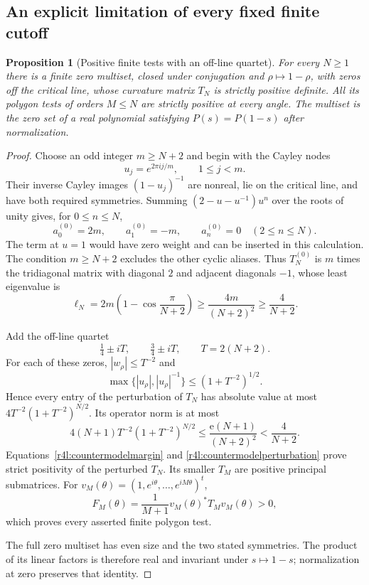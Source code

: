 \documentclass[11pt,a4paper]{article}
\newtheorem{proposition}[theorem]{Proposition}
\theoremstyle{definition}\newtheorem{definition}[theorem]{Definition}
\theoremstyle{remark}\newtheorem{remark}[theorem]{Remark}
\numberwithin{equation}{section}
\begin{document}
\subsection{An explicit limitation of every fixed finite cutoff}

\begin{proposition}[Positive finite tests with an off-line quartet]
\label{r4l:finitecountermodel}
For every $N\ge1$ there is a finite zero multiset, closed under
conjugation and $\rho\mapsto1-\rho$, with zeros off the critical line,
whose curvature matrix $T_N$ is strictly positive definite.  All its
polygon tests of orders $M\le N$ are strictly positive at every angle.
The multiset is the zero set of a real polynomial satisfying
$P(s)=P(1-s)$ after normalization.
\end{proposition}
\begin{proof}
Choose an odd integer $m\ge N+2$ and begin with the Cayley nodes
\[
 u_j=e^{2\pi i j/m},\qquad 1\le j<m.
\]
Their inverse Cayley images $(1-u_j)^{-1}$ are nonreal, lie on the
critical line, and have both required symmetries.  Summing
$(2-u-u^{-1})u^n$ over the roots of unity gives, for $0\le n\le N$,
\[
 a_0^{(0)}=2m,\qquad a_1^{(0)}=-m,\qquad
 a_n^{(0)}=0\quad(2\le n\le N).
\]
The term at $u=1$ would have zero weight and can be inserted in this
calculation.  The condition $m\ge N+2$ excludes the other cyclic
aliases.  Thus $T_N^{(0)}$ is $m$ times the tridiagonal matrix with
diagonal $2$ and adjacent diagonals $-1$, whose least eigenvalue is
\begin{equation}\label{r4l:countermodelmargin}
 \ell_N=2m\left(1-\cos\frac\pi{N+2}\right)
 \ge\frac{4m}{(N+2)^2}\ge\frac4{N+2}.
\end{equation}

Add the off-line quartet
\[
 \tfrac14\pm iT,\qquad\tfrac34\pm iT,
 \qquad T=2(N+2).
\]
For each of these zeros, $|w_\rho|\le T^{-2}$ and
\[
 \max\{|u_\rho|,|u_\rho|^{-1}\}
 \le(1+T^{-2})^{1/2}.
\]
Hence every entry of the perturbation of $T_N$ has absolute value at
most $4T^{-2}(1+T^{-2})^{N/2}$.  Its operator norm is at most
\begin{equation}\label{r4l:countermodelperturbation}
 4(N+1)T^{-2}(1+T^{-2})^{N/2}
 \le\frac{\mathrm e(N+1)}{(N+2)^2}
 <\frac4{N+2}.
\end{equation}
Equations~\eqref{r4l:countermodelmargin} and
\eqref{r4l:countermodelperturbation} prove strict positivity of the
perturbed $T_N$.  Its smaller $T_M$ are positive principal submatrices.
For $v_M(\theta)=(1,e^{i\theta},\ldots,e^{iM\theta})^t$,
\[
 F_M(\theta)=\frac1{M+1}v_M(\theta)^*T_Mv_M(\theta)>0,
\]
which proves every asserted finite polygon test.

The full zero multiset has even size and the two stated symmetries.
The product of its linear factors is therefore real and invariant
under $s\mapsto1-s$; normalization at zero preserves that identity.
\end{proof}
\end{document}
